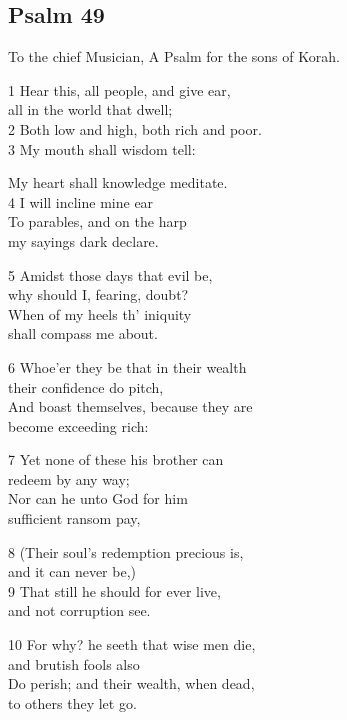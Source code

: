 \begin{center}
\quad{}\quad{}
\end{center}

\subsection*{Psalm 49}

To the chief Musician,
A Psalm for the sons of Korah.

1 Hear this, all people, and give ear,\\
all in the world that dwell;\\
2 Both low and high, both rich and poor.\\
3 My mouth shall wisdom tell:

My heart shall knowledge meditate.\\
4 I will incline mine ear\\
To parables, and on the harp\\
my sayings dark declare.

5 Amidst those days that evil be,\\
why should I, fearing, doubt?\\
When of my heels th’ iniquity\\
shall compass me about.

6 Whoe’er they be that in their wealth\\
their confidence do pitch,\\
And boast themselves, because they are\\
become exceeding rich:

7 Yet none of these his brother can\\
redeem by any way;\\
Nor can he unto God for him\\
sufficient ransom pay,

8 (Their soul’s redemption precious is,\\
and it can never be,)\\
9 That still he should for ever live,\\
and not corruption see.

10 For why? he seeth that wise men die,\\
and brutish fools also\\
Do perish; and their wealth, when dead,\\
to others they let go.

